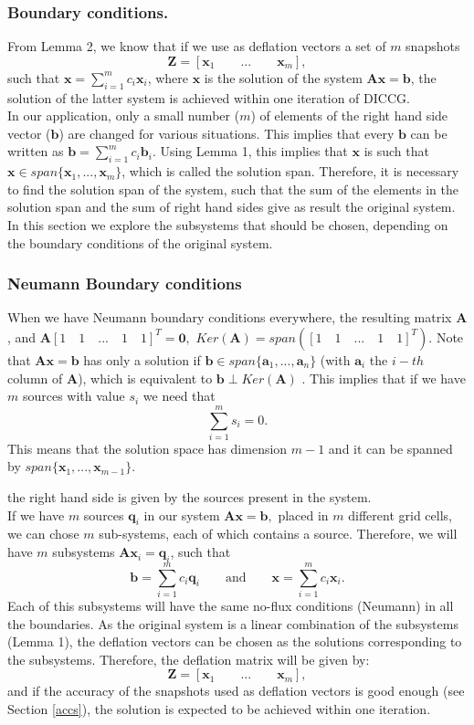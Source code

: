 \documentclass[12pt]{article}
\begin{document}
\subsubsection{Boundary conditions.}
From Lemma 2, we know that if we use as deflation vectors a set of $m$ snapshots $$\mathbf{Z}=[\mathbf{x}_1\qquad ...\qquad \mathbf{x}_m],$$ such that $\mathbf{x}=\sum_{i=1}^m {c}_i\mathbf{x}_i$, where $\mathbf{x}$ is the solution of the system $\mathbf{A}\mathbf{x}=\mathbf{b}$, the solution of the latter system is achieved within one iteration of DICCG. \\
In our application, only a small number ($m$) of elements of the right hand side vector ($\mathbf{b}$)
are changed for various situations. This implies that every $\mathbf{b}$ can be written as $\mathbf{b}=\sum_{i=1}^m {c}_i\mathbf{b}_i.$ Using Lemma 1, this implies that $\mathbf{x}$ is such that 
$\mathbf{x}\in span\{ \mathbf{x}_1, ...,  \mathbf{x}_m\}$, which is called the solution span.
Therefore, it is necessary to find the solution span of the system, such that the sum of the elements in the solution span and the sum of right hand sides give as result the original system. In this section we explore the subsystems that should be chosen, depending on the boundary conditions of the original system. 
\subsubsection*{{Neumann Boundary conditions}}
When we have Neumann boundary conditions everywhere, the resulting matrix $\mathbf{A}$, and
$\mathbf{A}[1\quad 1\quad ...\quad 1\quad 1]^T=\mathbf{0},$ $Ker(\mathbf{A})=span([1\quad 1\quad ...\quad 1\quad 1]^T)$. 
Note that $\mathbf{A}\mathbf{x}=\mathbf{b}$ has only a solution if $\mathbf{b}\in span\{\mathbf{a}_1,...,\mathbf{a}_n\}$ (with $\mathbf{a}_i$ the $i-th$ column of $\mathbf{A}$), which is equivalent to $\mathbf{b}\perp Ker(\mathbf{A}) $ \cite{Strang09}.
This implies that if we have $m$ sources with value ${s}_i$ we need that 
$$\sum_{i=1}^ m {s}_i=0.$$
This means that the solution space has dimension $m-1$ and it can be spanned by $span\{\mathbf{x}_1,...,\mathbf{x}_{m-1} \}$. 

the right hand side is given by the sources present in the system. \\
If we have $m$ sources $\mathbf{q}_i$ in our system $\mathbf{A}\mathbf{x}=\mathbf{b},$ placed in $m$ different grid cells, we can chose $m$ sub-systems, each of which contains a source. 
Therefore, we will have $m$ subsystems $\mathbf{A}\mathbf{x}_i=\mathbf{q}_i$, such that $$\mathbf{b}=\sum_{i=1}^m {c}_i\mathbf{q}_i \qquad \text{and} \qquad \mathbf{x}=\sum_{i=1}^m {c}_i\mathbf{x}_i.$$
Each of this subsystems will have the same no-flux conditions (Neumann) in all the boundaries.
As the original system is a linear combination of the subsystems (Lemma 1), the deflation vectors can be chosen as the solutions corresponding to the subsystems. Therefore, the deflation matrix will be given by:
$$\mathbf{Z}=[\mathbf{x}_1\qquad ...\qquad \mathbf{x}_m],$$
and if the accuracy of the snapshots used as deflation vectors is good enough (see Section \ref{accs}), the solution is expected to be achieved within one iteration. 
\end{document}
